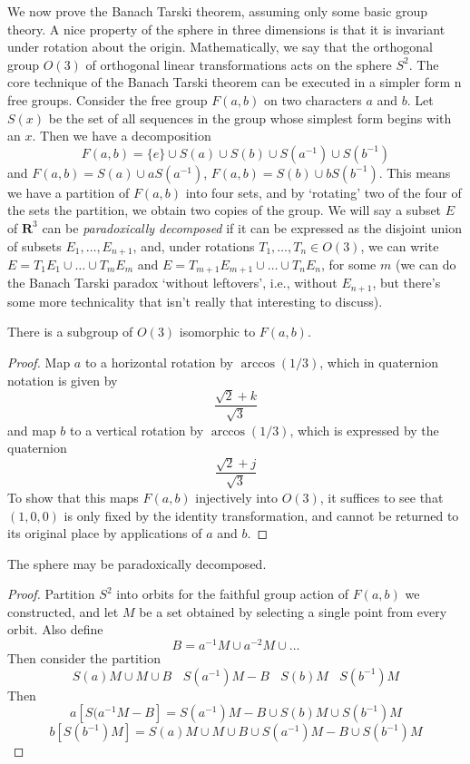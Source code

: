 We now prove the Banach Tarski theorem, assuming only some basic group theory. A nice property of the sphere in three dimensions is that it is invariant under rotation about the origin. Mathematically, we say that the orthogonal group $O(3)$ of orthogonal linear transformations acts on the sphere $S^2$. The core technique of the Banach Tarski theorem can be executed in a simpler form n free groups. Consider the free group $F(a,b)$ on two characters $a$ and $b$. Let $S(x)$ be the set of all sequences in the group whose simplest form begins with an $x$. Then we have a decomposition
%
\[ F(a,b) = \{ e \} \cup S(a) \cup S(b) \cup S(a^{-1}) \cup S(b^{-1}) \]
%
and $F(a,b) = S(a) \cup aS(a^{-1})$, $F(a,b) = S(b) \cup bS(b^{-1})$. This means we have a partition of $F(a,b)$ into four sets, and by `rotating' two of the four of the sets the partition, we obtain two copies of the group. We will say a subset $E$ of $\mathbf{R}^3$ can be {\it paradoxically decomposed} if it can be expressed as the disjoint union of subsets $E_1, \dots, E_{n+1}$, and, under rotations $T_1, \dots, T_n \in O(3)$, we can write $E = T_1E_1 \cup \dots \cup T_mE_m$ and $E = T_{m+1}E_{m+1} \cup \dots \cup T_nE_n$, for some $m$ (we can do the Banach Tarski paradox `without leftovers', i.e., without $E_{n+1}$, but there's some more technicality that isn't really that interesting to discuss).

\begin{lemma}
    There is a subgroup of $O(3)$ isomorphic to $F(a,b)$.
\end{lemma}
\begin{proof}
    Map $a$ to a horizontal rotation by $\arccos(1/3)$, which in quaternion notation is given by
    \[ \frac{\sqrt{2} + k}{\sqrt{3}} \]
    and map $b$ to a vertical rotation by $\arccos(1/3)$, which is expressed by the quaternion
    \[ \frac{\sqrt{2} + j}{\sqrt{3}} \]
    To show that this maps $F(a,b)$ injectively into $O(3)$, it suffices to see that $(1,0,0)$ is only fixed by the identity transformation, and cannot be returned to its original place by applications of $a$ and $b$.
\end{proof}

\begin{theorem}
    The sphere may be paradoxically decomposed.
\end{theorem}
\begin{proof}
  Partition $S^2$ into orbits for the faithful group action of $F(a,b)$ we constructed, and let $M$ be a set obtained by selecting a single point from every orbit. Also define
  \[ B = a^{-1}M \cup a^{-2}M \cup \dots \]
  Then consider the partition
  \[ S(a)M \cup M \cup B\ \ \ \ S(a^{-1})M - B\ \ \ \ S(b)M\ \ \ \ S(b^{-1})M \]
  Then
  \[ a[S(a^{-1}M - B] = S(a^{-1})M - B \cup S(b)M \cup S(b^{-1})M \]
  \[ b[S(b^{-1})M] = S(a)M \cup M \cup B \cup S(a^{-1})M - B \cup S(b^{-1})M \]
\end{proof}

